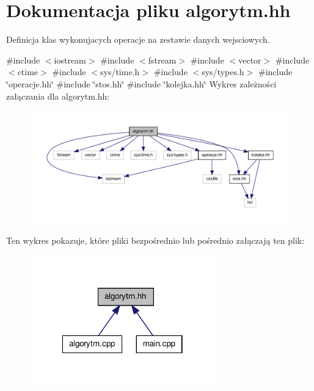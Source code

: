 \hypertarget{algorytm_8hh}{\section{\-Dokumentacja pliku algorytm.\-hh}
\label{algorytm_8hh}
}


\-Definicja klas wykonujacych operacje na zestawie danych wejsciowych.  


{\ttfamily \#include $<$iostream$>$}\*
{\ttfamily \#include $<$fstream$>$}\*
{\ttfamily \#include $<$vector$>$}\*
{\ttfamily \#include $<$ctime$>$}\*
{\ttfamily \#include $<$sys/time.\-h$>$}\*
{\ttfamily \#include $<$sys/types.\-h$>$}\*
{\ttfamily \#include \char`\"{}operacje.\-hh\char`\"{}}\*
{\ttfamily \#include \char`\"{}stos.\-hh\char`\"{}}\*
{\ttfamily \#include \char`\"{}kolejka.\-hh\char`\"{}}\*
\-Wykres zależności załączania dla algorytm.\-hh\-:
\nopagebreak
\begin{figure}[H]
\begin{center}
\leavevmode
\includegraphics[width=350pt]{algorytm_8hh__incl}
\end{center}
\end{figure}
\-Ten wykres pokazuje, które pliki bezpośrednio lub pośrednio załączają ten plik\-:\nopagebreak
\begin{figure}[H]
\begin{center}
\leavevmode
\includegraphics[width=226pt]{algorytm_8hh__dep__incl}
\end{center}
\end{figure}
